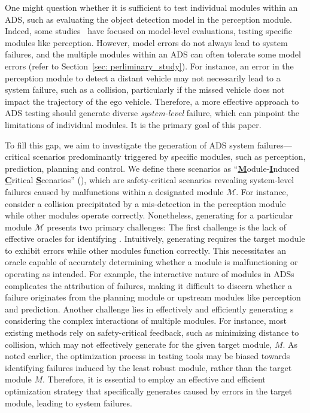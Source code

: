 One might question whether it is sufficient to test individual modules within an ADS, such as evaluating the object detection model in the perception module. Indeed, some studies~\cite{ma2024slowtrack, zhang2024data} have focused on model-level evaluations, testing specific modules like perception. However, model errors do not always lead to system failures, and the multiple modules within an ADS can often tolerate some model errors (refer to Section~\ref{sec: perliminary_study}). For instance, an error in the perception module to detect a distant vehicle may not necessarily lead to a system failure, such as a collision, particularly if the missed vehicle does not impact the trajectory of the ego vehicle. Therefore, a more effective approach to ADS testing should generate diverse \textit{system-level} failure, which can pinpoint the limitations of individual modules. It is the primary goal of this paper.




To fill this gap, we aim to investigate the generation of ADS system failures—critical scenarios predominantly triggered by specific modules, such as perception, prediction, planning and control. We define these scenarios as 
``\textbf{\underline{M}}odule-\textbf{\underline{I}}nduced \textbf{\underline{C}}ritical \textbf{\underline{S}}cenarios'' (\mccs), which are safety-critical scenarios revealing system-level failures caused by malfunctions within a designated module $\mathcal{M}$. For instance, consider a collision precipitated by a mis-detection in the perception module while other modules operate correctly. Nonetheless, generating \mccs for a particular module $\mathcal{M}$ presents two primary challenges: 
 The first challenge is the lack of effective oracles for identifying \mccs. Intuitively, generating \mccs requires the target module to exhibit errors while other modules function correctly. This necessitates an oracle capable of accurately determining whether a module is malfunctioning or operating as intended. For example, the interactive nature of modules in ADSs complicates the attribution of failures, making it difficult to discern whether a failure originates from the planning module or upstream modules like perception and prediction.
 Another challenge lies in effectively and efficiently generating {\mccs}s considering the complex interactions of multiple modules. For instance, most existing methods rely on safety-critical feedback, such as minimizing distance to collision, which may not effectively generate \mccs for the given target module, $M$. As noted earlier, the optimization process in testing tools may be biased towards identifying failures induced by the least robust module, rather than the target module $M$. Therefore, it is essential to employ an effective and efficient optimization strategy that specifically generates \mccs caused by errors in the target module, leading to system failures.



